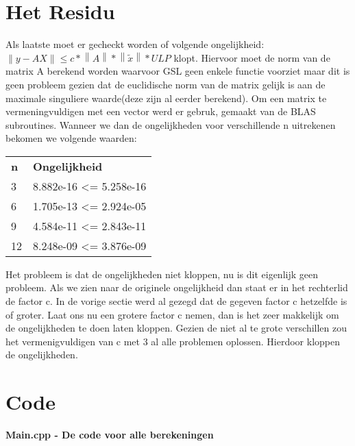 \documentclass[10pt,a4paper]{article}
\begin{document}
\section{Het Residu}
Als laatste moet er gecheckt worden of volgende ongelijkheid: $\left \| y - AX \right \|  \leqslant c*\left \| A \right \|*\left \| \tilde{x} \right \|*ULP$ klopt. Hiervoor moet de norm van de matrix A berekend worden waarvoor GSL geen enkele functie voorziet maar dit is geen probleem gezien dat de euclidische norm van de matrix gelijk is aan de maximale singuliere waarde(deze zijn al eerder berekend). Om een matrix te vermeningvuldigen met een vector werd er gebruk, gemaakt van de BLAS subroutines. Wanneer we dan de ongelijkheden voor verschillende n uitrekenen bekomen we volgende waarden:
\begin{center}
\begin{tabular}{ll}
\textbf{n} & \textbf{Ongelijkheid} \\
3          & 8.882e-16 <= 5.258e-16            \\
6          & 1.705e-13 <= 2.924e-05         \\
9          &  4.584e-11 <= 2.843e-11          \\
12         & 8.248e-09 <= 3.876e-09          
\end{tabular}
\end{center}
Het probleem is dat de ongelijkheden niet kloppen, nu is dit eigenlijk geen probleem. Als we zien naar de originele ongelijkheid dan staat er in het rechterlid de factor c. In de vorige sectie werd al gezegd dat de gegeven factor c hetzelfde is of groter. Laat ons nu een grotere factor c nemen, dan is het zeer makkelijk om de ongelijkheden te doen laten kloppen. Gezien de niet al te grote verschillen zou het vermenigvuldigen van c met 3 al alle problemen oplossen. Hierdoor kloppen de ongelijkheden.
\section{Code}
\textbf{Main.cpp - De code voor alle berekeningen}

\end{document}
